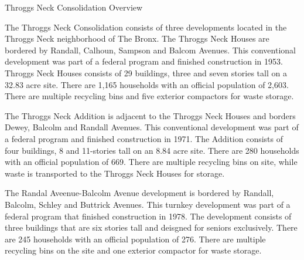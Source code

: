 Throggs Neck Consolidation Overview

The Throggs Neck Consolidation consists of three developments located in the Throggs Neck neighborhood of The Bronx. The Throggs Neck Houses are bordered by Randall, Calhoun, Sampson and Balcom Avenues. This conventional development was part of a federal program and finished construction in 1953. Throggs Neck Houses consists of 29 buildings, three and seven stories tall on a 32.83 acre site. There are 1,165 households with an official population of 2,603. There are multiple recycling bins and five exterior compactors for waste storage.

The Throggs Neck Addition is adjacent to the Throggs Neck Houses and borders Dewey, Balcolm and Randall Avenues. This conventional development was part of a federal program and finished construction in 1971. The Addition consists of four buildings, 8 and 11-stories tall on an 8.84 acre site. There are 280 households with an official population of 669. There are multiple recycling bins on site, while waste is transported to the Throggs Neck Houses for storage.

The Randal Aveenue-Balcolm Avenue development is bordered by Randall, Balcolm, Schley and Buttrick Avenues.  This turnkey development was part of a federal program that finished construction in 1978. The development consists of three buildings that are six stories tall and deisgned for seniors exclusively. There are 245 households with an official population of 276. There are multiple recycling bins on the site and one exterior compactor for waste storage.
